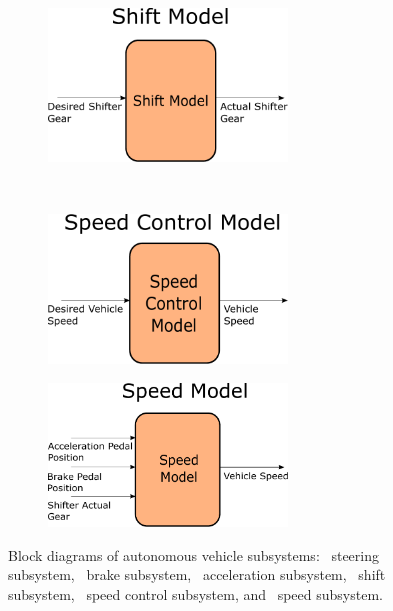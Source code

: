 \documentclass[letterpaper,12pt]{article}   %
\begin{document}
\begin{figure}[htb]
\begin{subfigure}[b]{0.48\linewidth}
  \centering 
  \includegraphics[width=2.5in]{figs/inkscape/shiftModelArchitecture}
  \caption{}
  \label{fig:shiftModelArchitecture}
\end{subfigure}
\\
\begin{subfigure}[b]{0.48\linewidth}
  \centering
  \includegraphics[width=2.5in]{figs/inkscape/speedControlModelArchitecture}
  \caption{}
  \label{fig:speedControlModelArchitecture}
\end{subfigure}
\begin{subfigure}[b]{0.48\linewidth}
  \centering
  \includegraphics[width=2.5in]{figs/inkscape/speedModelArchitecture}
  \caption{}
  \label{fig:speedModelArchitecture}
\end{subfigure}
\caption{Block diagrams of autonomous vehicle subsystems:~ steering subsystem,~ brake subsystem,~ acceleration subsystem,~ shift subsystem,~ speed control subsystem, and~ speed subsystem.}
\label{fig:subFunctionalBlock}
\end{figure}
%
\end{document}
